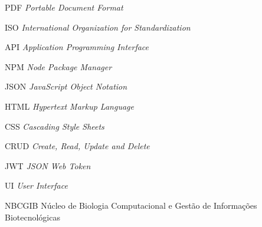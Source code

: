 \begin{siglas}

\item[PDF] \textit{Portable Document Format} 
\item[ISO] \textit{International Organization for Standardization}

\item[API] \textit{Application Programming Interface}

\item[NPM] \textit{Node Package Manager}

\item[JSON] \textit{JavaScript Object Notation}

\item[HTML] \textit{Hypertext Markup Language}

\item[CSS] \textit{Cascading Style Sheets}

\item[CRUD] \textit{Create, Read, Update and Delete}

\item[JWT] \textit{JSON Web Token}

\item[UI] \textit{User Interface}

\item[NBCGIB] Núcleo de Biologia Computacional e Gestão de Informações Biotecnológicas

\end{siglas}






